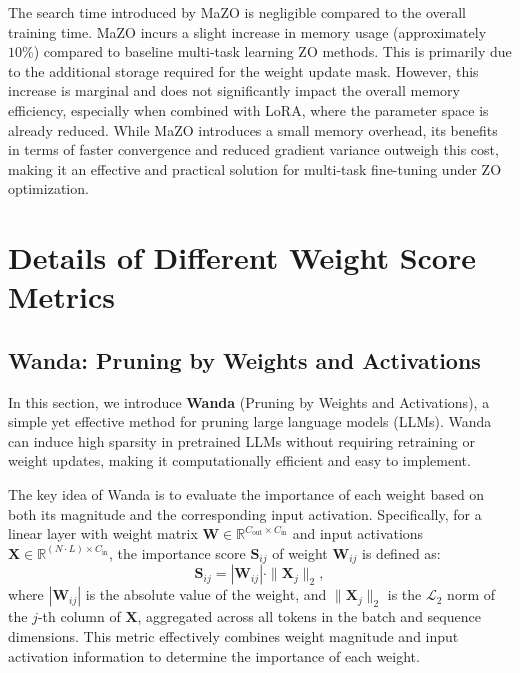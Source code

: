 The search time introduced by MaZO is negligible compared to the overall training time.
MaZO incurs a slight increase in memory usage (approximately $10\%$) compared to baseline multi-task learning ZO methods. This is primarily due to the additional storage required for the weight update mask. However, this increase is marginal and does not significantly impact the overall memory efficiency, especially when combined with LoRA, where the parameter space is already reduced.
While MaZO introduces a small memory overhead, its benefits in terms of faster convergence and reduced gradient variance outweigh this cost, making it an effective and practical solution for multi-task fine-tuning under ZO optimization.



\section{Details of Different Weight Score Metrics}
\label{app:metrics}

\subsection{Wanda: Pruning by Weights and Activations}

In this section, we introduce \textbf{Wanda} (Pruning by Weights and Activations), a simple yet effective method for pruning large language models (LLMs). Wanda can induce high sparsity in pretrained LLMs without requiring retraining or weight updates, making it computationally efficient and easy to implement.

The key idea of Wanda is to evaluate the importance of each weight based on both its magnitude and the corresponding input activation. Specifically, for a linear layer with weight matrix $\mathbf{W} \in \mathbb{R}^{C_{\text{out}} \times C_{\text{in}}}$ and input activations $\mathbf{X} \in \mathbb{R}^{(N \cdot L) \times C_{\text{in}}}$, the importance score $\mathbf{S}_{ij}$ of weight $\mathbf{W}_{ij}$ is defined as:
\begin{equation}
    \mathbf{S}_{ij} = |\mathbf{W}_{ij}| \cdot \|\mathbf{X}_j\|_2,
\end{equation}
where $|\mathbf{W}_{ij}|$ is the absolute value of the weight, and $\|\mathbf{X}_j\|_2$ is the $\mathcal{L}_2$ norm of the $j$-th column of $\mathbf{X}$, aggregated across all tokens in the batch and sequence dimensions. This metric effectively combines weight magnitude and input activation information to determine the importance of each weight.

